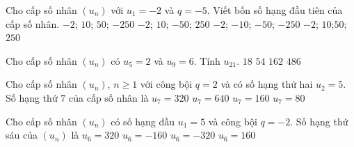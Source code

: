 \begin{ex}%
	Cho cấp số nhân $(u_n)$ với $u_1 = -2$ và $q = -5$. Viết bốn số hạng đầu tiên của  cấp số nhân.
	\choice 
		{$-2$;  $10$; $50$; $-250$}
		 {\True $-2$; $10$; $-50$; $250$}
		{$-2$; $-10$; $-50$; $-250$} 
		 {$-2$; $10$;$50$; $250$}
\end{ex}

\begin{ex}%
	Cho cấp số nhân $(u_n)$ có  $u_5=2$ và $u_9=6$. Tính $u_{21}$.
	\choice 
		{$18$} 
		{$54$} 
		{\True $162$} 
		 {$486$}
\end{ex}

\begin{ex}%
	Cho cấp  số nhân $(u_n)$, $n \ge 1$ với công bội $q=2$ và có số hạng thứ hai $u_2=5$. Số hạng thứ $7$ của cấp số nhân là
	 \choice
		{$u_7=320$} 
		{$u_7=640$} 
		{\True $u_7=160$} 
		{$u_7=80$} 
\end{ex}

\begin{ex}%
	Cho cấp số nhân $\left(u_n \right)$ có số hạng đầu  $u_1=5$ và công bội $q=-2$. Số hạng thứ sáu của $\left(u_n \right)$ là
	\choice 
		 {$u_6=320$}
		 {\True $u_6=-160$}
		 {$u_6=-320$}
		{$u_6=160$} 
\end{ex}

